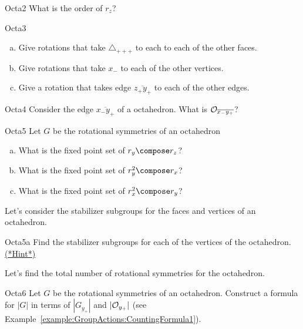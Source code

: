 \begin{exercise}{Octa2}
What is the order of $r_z$?
\end{exercise}

\begin{exercise}{Octa3}
\begin{enumerate}[(a)]
\item Give rotations that take $\triangle _{+++}$ to each to each of the other faces.
\item Give rotations that take  $x_-$ to each of the other vertices.
\item Give a rotation that takes edge $\overline{z_+y_+}$ to each of the other edges.
\end{enumerate}
\end{exercise} 
\begin{exercise}{Octa4}
Consider the edge $\overline{x_-y_+}$ of a octahedron. What is ${\cal O}_{\overline{x_-y_+}}$?
\end {exercise}

\begin{exercise}{Octa5}
Let $G$ be the rotational symmetries of an octahedron
\begin{enumerate}[(a)]
\item  What is the fixed point set of $r_{y}\compose r_{z}$?
\item What is the fixed point set of $r_{y}^2\compose r_{x}$? 
\item What is the fixed point set of $r_{x}^2\compose r_{y}$?
\end{enumerate}
\end {exercise}

Let's consider the stabilizer subgroups for the faces and vertices of an octahedron.  
 
\begin{exercise}{Octa5a}
Find the stabilizer subgroups for each of the vertices of the octahedron. 
\hyperref[sec:GroupActions:Hints]{(*Hint*)}
\end{exercise}

Let's find the total number of rotational symmetries for the octahedron. 

\begin{exercise}{Octa6} 
Let $G$ be the rotational symmetries of an octahedron. Construct a formula for $|G|$ in terms of $| G_{y_+}|$ and $|{\cal O}_{y_+}|$ (see Example~\ref{example:GroupActions:CountingFormula1}).
 \end {exercise}

